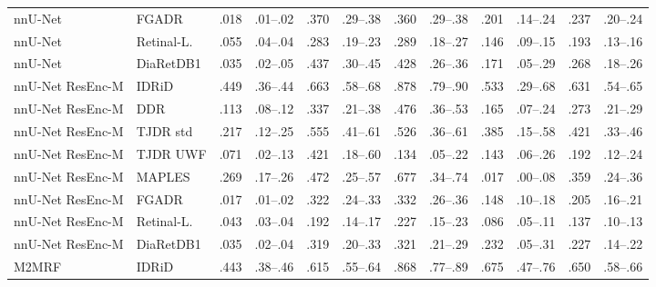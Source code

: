 \begin{landscape}
{\begin{longtable}{l l c c c c c c c c c c}
nnU-Net & FGADR & .018 & \scriptsize .01--.02 & .370 & \scriptsize .29--.38 & .360 & \scriptsize .29--.38 & .201 & \scriptsize .14--.24 & .237 & \scriptsize .20--.24 \\
nnU-Net & Retinal-L. & .055 & \scriptsize .04--.04 & .283 & \scriptsize .19--.23 & .289 & \scriptsize .18--.27 & .146 & \scriptsize .09--.15 & .193 & \scriptsize .13--.16 \\
nnU-Net & DiaRetDB1 & .035 & \scriptsize .02--.05 & .437 & \scriptsize .30--.45 & .428 & \scriptsize .26--.36 & .171 & \scriptsize .05--.29 & .268 & \scriptsize .18--.26 \\
nnU-Net ResEnc-M & IDRiD & .449 & \scriptsize .36--.44 & .663 & \scriptsize .58--.68 & .878 & \scriptsize .79--.90 & .533 & \scriptsize .29--.68 & .631 & \scriptsize .54--.65 \\
nnU-Net ResEnc-M & DDR & .113 & \scriptsize .08--.12 & .337 & \scriptsize .21--.38 & .476 & \scriptsize .36--.53 & .165 & \scriptsize .07--.24 & .273 & \scriptsize .21--.29 \\
nnU-Net ResEnc-M & TJDR std & .217 & \scriptsize .12--.25 & .555 & \scriptsize .41--.61 & .526 & \scriptsize .36--.61 & .385 & \scriptsize .15--.58 & .421 & \scriptsize .33--.46 \\
nnU-Net ResEnc-M & TJDR UWF & .071 & \scriptsize .02--.13 & .421 & \scriptsize .18--.60 & .134 & \scriptsize .05--.22 & .143 & \scriptsize .06--.26 & .192 & \scriptsize .12--.24 \\
nnU-Net ResEnc-M & MAPLES & .269 & \scriptsize .17--.26 & .472 & \scriptsize .25--.57 & .677 & \scriptsize .34--.74 & .017 & \scriptsize .00--.08 & .359 & \scriptsize .24--.36 \\
nnU-Net ResEnc-M & FGADR & .017 & \scriptsize .01--.02 & .322 & \scriptsize .24--.33 & .332 & \scriptsize .26--.36 & .148 & \scriptsize .10--.18 & .205 & \scriptsize .16--.21 \\
nnU-Net ResEnc-M & Retinal-L. & .043 & \scriptsize .03--.04 & .192 & \scriptsize .14--.17 & .227 & \scriptsize .15--.23 & .086 & \scriptsize .05--.11 & .137 & \scriptsize .10--.13 \\
nnU-Net ResEnc-M & DiaRetDB1 & .035 & \scriptsize .02--.04 & .319 & \scriptsize .20--.33 & .321 & \scriptsize .21--.29 & .232 & \scriptsize .05--.31 & .227 & \scriptsize .14--.22 \\
M2MRF & IDRiD & .443 & \scriptsize .38--.46 & .615 & \scriptsize .55--.64 & .868 & \scriptsize .77--.89 & .675 & \scriptsize .47--.76 & .650 & \scriptsize .58--.66 \\

\end{longtable}}
\end{landscape}
